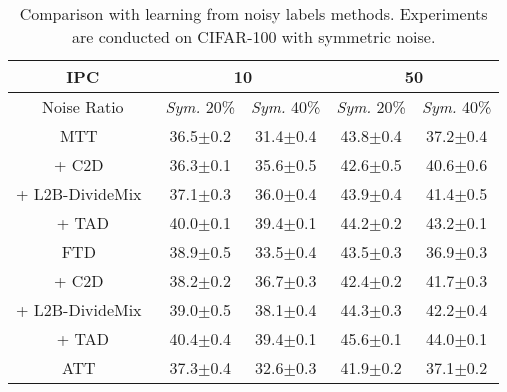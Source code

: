 
\begin{table}[ht]
    \centering
    \renewcommand{\arraystretch}{1.05}
    \setlength{\tabcolsep}{5pt}
    \caption{
    Comparison with learning from noisy labels methods. 
    Experiments are conducted on CIFAR-100 with symmetric noise.
    }
    \tiny
\begin{tabular}{c|cc|cc}
\toprule	
IPC           & \multicolumn{2}{c|}{10}               & \multicolumn{2}{c}{50}      \\ \midrule
Noise Ratio   & \multicolumn{1}{c}{\textit{Sym.} 20\%} & \textit{Sym.} 40\% & \multicolumn{1}{c}{\textit{Sym.} 20\%} & \textit{Sym.} 40\% \\ \midrule[.8pt] \midrule[.8pt]
MTT~\cite{cazenavette2022distillation}      & \multicolumn{1}{c}{36.5$\pm$0.2}   &    31.4$\pm$0.4& \multicolumn{1}{c}{43.8$\pm$0.4}   &    37.2$\pm$0.4\\ \midrule
+ C2D~\cite{zheltonozhskii2022contrast}     & \multicolumn{1}{c}{36.3$\pm$0.1}   &    35.6$\pm$0.5& \multicolumn{1}{c}{42.6$\pm$0.5}   &    40.6$\pm$0.6\\ \midrule
+ L2B-DivideMix~\cite{zhou2024l2b}          & \multicolumn{1}{c}{37.1$\pm$0.3}   &    36.0$\pm$0.4& \multicolumn{1}{c}{43.9$\pm$0.4}   &    41.4$\pm$0.5\\ \midrule
\rowcolor[HTML]{EFEFEF} + TAD                                        & \multicolumn{1}{c}{40.0$\pm$0.1}   &    39.4$\pm$0.1& \multicolumn{1}{c}{44.2$\pm$0.2}   &    43.2$\pm$0.1\\ \midrule[.8pt] \midrule[.8pt]
FTD~\cite{du2023minimizing}                 & \multicolumn{1}{c}{38.9$\pm$0.5}   &    33.5$\pm$0.4& \multicolumn{1}{c}{43.5$\pm$0.3}   &    36.9$\pm$0.3\\ \midrule
+ C2D~\cite{zheltonozhskii2022contrast}     & \multicolumn{1}{c}{38.2$\pm$0.2  }   &    36.7$\pm$0.3& \multicolumn{1}{c}{42.4$\pm$0.2}   &    41.7$\pm$0.3\\ \midrule
+ L2B-DivideMix~\cite{zhou2024l2b}          & \multicolumn{1}{c}{39.0$\pm$0.5}   &    38.1$\pm$0.4& \multicolumn{1}{c}{44.3$\pm$0.3}   &    42.2$\pm$0.4\\ \midrule
\rowcolor[HTML]{EFEFEF} + TAD                                        & \multicolumn{1}{c}{40.4$\pm$0.4}   &    39.4$\pm$0.1& \multicolumn{1}{c}{45.6$\pm$0.1}   &    44.0$\pm$0.1\\ \midrule[.8pt] \midrule[.8pt]
ATT~\cite{liu2024dataset}                   & \multicolumn{1}{c}{37.3$\pm$0.4}   &    32.6$\pm$0.3& \multicolumn{1}{c}{41.9$\pm$0.2}   &    37.1$\pm$0.2\\ \midrule

\end{tabular}
\end{table}

